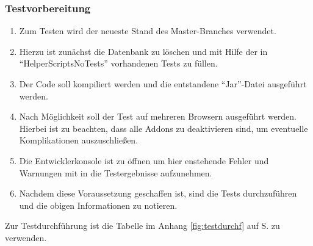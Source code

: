 \subsubsection*{Testvorbereitung}
\begin{enumerate}
    \item Zum Testen wird der neueste Stand des Master-Branches verwendet.
    \item Hierzu ist zunächst die Datenbank zu löschen und mit Hilfe der in \enquote{HelperScriptsNoTests}        vorhandenen Tests zu füllen.
    \item Der Code soll kompiliert werden und die entstandene \enquote{Jar}-Datei ausgeführt werden.
    \item Nach Möglichkeit soll der Test auf mehreren Browsern ausgeführt werden. Hierbei ist zu beachten, dass alle Addons zu deaktivieren sind, um eventuelle Komplikationen auszuschließen.
    \item Die Entwicklerkonsole ist zu öffnen um hier enstehende Fehler und Warnungen mit in die Testergebnisse aufzunehmen.
    \item Nachdem diese Voraussetzung geschaffen ist, sind die Tests durchzuführen und die obigen Informationen zu notieren.
\end{enumerate}

Zur Testdurchführung ist die Tabelle im Anhang \ref{fig:testdurchf} auf S.\pageref{fig:testdurchf} zu verwenden.

